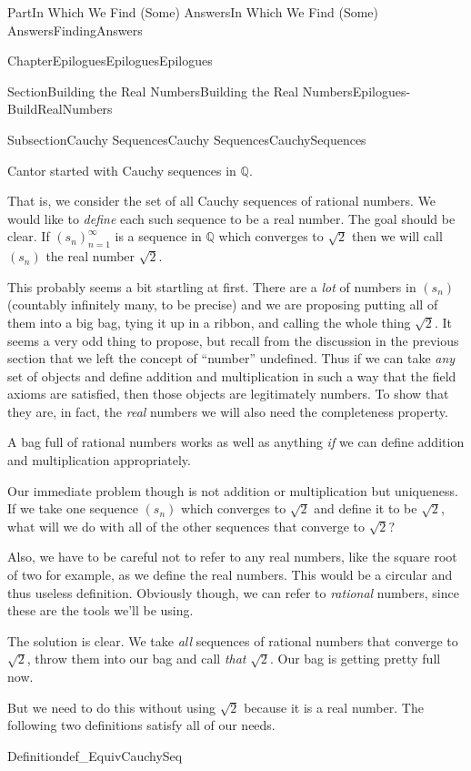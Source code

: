 \documentclass[oneside,10pt,]{book}
\numberwithin{equation}{part}
\newcommand{\QQ}{\mathbb {Q}}
\begin{document}
\begin{partptx}{Part}{In Which We Find (Some) Answers}{}{In Which We Find (Some) Answers}{}{}{FindingAnswers}
\begin{chapterptx}{Chapter}{Epilogues}{}{Epilogues}{}{}{Epilogues}
\begin{sectionptx}{Section}{Building the Real Numbers}{}{Building the Real Numbers}{}{}{Epilogues-BuildRealNumbers}
\begin{subsectionptx}{Subsection}{Cauchy Sequences}{}{Cauchy Sequences}{}{}{CauchySequences}
\par
Cantor started with Cauchy sequences in \(\QQ\).%
\par
That is, we consider the set of all Cauchy sequences of rational numbers.  We would like to \emph{define} each such sequence to be a real number.  The goal should be clear.  If \(\left(s_n\right)_{n=1}^\infty\) is a sequence in \(\QQ\) which converges to \(\sqrt{2}\) then we will call \(\left(s_n\right)\) the real number \(\sqrt{2}\).%
\par
This probably seems a bit startling at first.  There are a \emph{lot} of numbers in \(\left(s_n\right)\) (countably infinitely many, to be precise) and we are proposing putting all of them into a big bag, tying it up in a ribbon, and calling the whole thing \(\sqrt{2}\).  It seems a very odd thing to propose, but recall from the discussion in the previous section that we left the concept of ``number'' undefined.  Thus if we can take \emph{any} set of objects and define addition and multiplication in such a way that the field axioms are satisfied, then those objects are legitimately numbers.  To show that they are, in fact, the \emph{real} numbers we will also need the completeness property.%
\par
A bag full of rational numbers works as well as anything \emph{if} we can define addition and multiplication appropriately.%
\par
Our immediate problem though is not addition or multiplication but uniqueness.  If we take one sequence \(\left(s_n\right)\) which converges to \(\sqrt{2}\) and define it to be \(\sqrt{2}\), what will we do with all of the other sequences that converge to \(\sqrt{2}?\)%
\par
Also, we have to be careful not to refer to any real numbers, like the square root of two for example, as we define the real numbers.  This would be a circular \textemdash{} and thus useless \textemdash{} definition.  Obviously though, we can refer to \emph{rational} numbers, since these are the tools we'll be using.%
\par
The solution is clear.  We take \emph{all} sequences of rational numbers that converge to \(\sqrt{2}\), throw them into our bag and call \emph{that} \(\sqrt{2}\). Our bag is getting pretty full now.%
\par
But we need to do this without using \(\sqrt{2}\) because it is a real number.  The following two definitions satisfy all of our needs.%
\begin{definition}{Definition}{}{def_EquivCauchySeq}%
%

\end{definition}
\end{subsectionptx}
\end{sectionptx}
\end{chapterptx}
\end{partptx}
\end{document}
